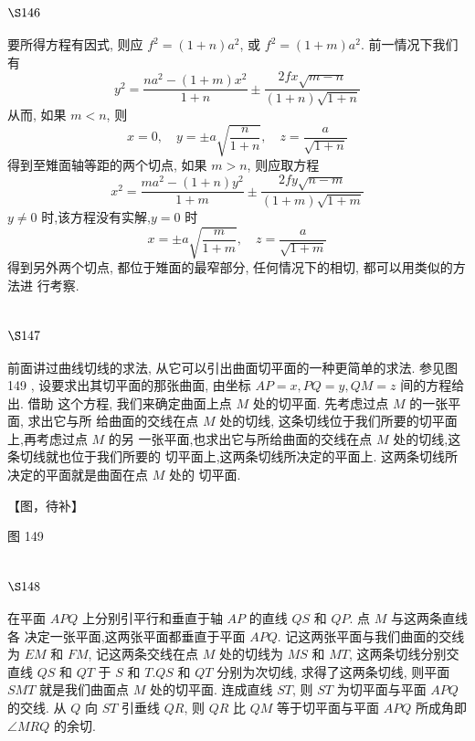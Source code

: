 \section{$\S 146$}

要所得方程有因式, 则应 $f^{2}=(1+n) a^{2}$, 或 $f^{2}=(1+m) a^{2}$. 前一情况下我们有
\[
y^{2}=\frac{n a^{2}-(1+m) x^{2}}{1+n} \pm \frac{2 f x \sqrt{m-n}}{(1+n) \sqrt{1+n}}
\]
从而, 如果 $m<n$, 则
\[
x=0, \quad y=\pm a \sqrt{\frac{n}{1+n}}, \quad z=\frac{a}{\sqrt{1+n}}
\]
得到至雉面轴等距的两个切点, 如果 $m>n$, 则应取方程
\[
x^{2}=\frac{m a^{2}-(1+n) y^{2}}{1+m} \pm \frac{2 f y \sqrt{n-m}}{(1+m) \sqrt{1+m}}
\]
$y \neq 0$ 时,该方程没有实解,$y=0$ 时
\[
x=\pm a \sqrt{\frac{m}{1+m}}, \quad z=\frac{a}{\sqrt{1+m}}
\]
得到另外两个切点, 都位于雉面的最窄部分, 任何情况下的相切, 都可以用类似的方法进 行考察.

\section{$\S 147$}

前面讲过曲线切线的求法, 从它可以引出曲面切平面的一种更简单的求法. 参见图 149 , 设要求出其切平面的那张曲面, 由坐标 $A P=x, P Q=y, Q M=z$ 间的方程给出. 借助 这个方程, 我们来确定曲面上点 $M$ 处的切平面. 先考虑过点 $M$ 的一张平面, 求出它与所 给曲面的交线在点 $M$ 处的切线, 这条切线位于我们所要的切平面上,再考虑过点 $M$ 的另 一张平面,也求出它与所给曲面的交线在点 $M$ 处的切线,这条切线就也位于我们所要的 切平面上,这两条切线所决定的平面上. 这两条切线所决定的平面就是曲面在点 $M$ 处的 切平面.


【图，待补】

图 149

\section{$\S 148$}

在平面 $A P Q$ 上分别引平行和垂直于轴 $A P$ 的直线 $Q S$ 和 $Q P$. 点 $M$ 与这两条直线各 决定一张平面,这两张平面都垂直于平面 $A P Q$. 记这两张平面与我们曲面的交线为 $E M$ 和 $F M$, 记这两条交线在点 $M$ 处的切线为 $M S$ 和 $M T$, 这两条切线分别交直线 $Q S$ 和 $Q T$ 于 $S$ 和 $T . Q S$ 和 $Q T$ 分别为次切线, 求得了这两条切线, 则平面 $S M T$ 就是我们曲面点 $M$ 处的切平面. 连成直线 $S T$, 则 $S T$ 为切平面与平面 $A P Q$ 的交线. 从 $Q$ 向 $S T$ 引垂线 $Q R$, 则 $Q R$ 比 $Q M$ 等于切平面与平面 $A P Q$ 所成角即 $\angle M R Q$ 的余切.


